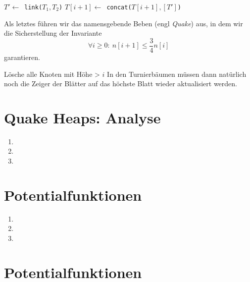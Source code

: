 \documentclass[a4paper,10pt]{article}
\begin{document}
\begin{description}
\begin{algorithmic}
            \STATE $T' \gets$\ \verb!link(!$T_1, T_2$\verb!)!
            \STATE $T[i+1] \gets$\ \verb!concat(!$T[i+1], [T']$\verb!)!
        \ENDWHILE
    \ENDFOR
    \end{algorithmic}
    Als letztes führen wir das namensgebende Beben (engl \emph{Quake}) aus, in dem wir die Sicherstellung der Invariante
    \[\forall i \geq 0{:}\ n[i+1] \leq \frac{3}{4} n[i]\]
    garantieren.
    \begin{algorithmic}
            \STATE Lösche alle Knoten mit Höhe > $i$
        \ENDIF
    \ENDFOR
    In den Turnierbäumen müssen dann natürlich noch die Zeiger der Blätter auf das höchste Blatt wieder aktualisiert werden.
    \end{algorithmic}
\end{description}

\section{Quake Heaps: Analyse}
\begin{enumerate}
\item   
\item   
\item   
\end{enumerate}

\section{Potentialfunktionen}
\begin{enumerate}
\item   
\item   
\item   
\end{enumerate}

\section{Potentialfunktionen}
\end{document}
